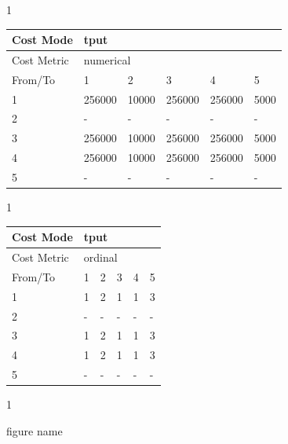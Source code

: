 \begin{figure}
\begin{subtable}{.46\linewidth}
    \caption{1}
    \end{subtable}
    \begin{subtable}{.65\linewidth}
        \centering
        \hspace{-4em}
        \begin{tabular}{|l|l|l|l|l|l|}
        \hline
        Cost Mode   & \multicolumn{5}{|l|}{tput}                       \\ \hline
        Cost Metric & \multicolumn{5}{|l|}{numerical}                  \\ \hline
        From/To     & 1         & 2     & 3        & 4        & 5      \\ \hline
        1           & 256000    & 10000 & 256000   & 256000   & 5000   \\ \hline
        2           & -         & -     & -        & -        & -      \\ \hline
        3           & 256000    & 10000 & 256000   & 256000   & 5000   \\ \hline
        4           & 256000    & 10000 & 256000   & 256000   & 5000   \\ \hline
        5           & -         & -     & -        & -        & -      \\ \hline
        \end{tabular}
    \caption{1}
    \end{subtable}
    \begin{subtable}{.30\linewidth}
        \centering
        \begin{tabular}{|l|l|l|l|l|l|}
        \hline
        Cost Mode   & \multicolumn{5}{|l|}{tput}                       \\ \hline
        Cost Metric & \multicolumn{5}{|l|}{ordinal}                    \\ \hline
        From/To     & 1         & 2     & 3        & 4        & 5      \\ \hline
        1           & 1         & 2     & 1        & 1        & 3      \\ \hline
        2           & -         & -     & -        & -        & -      \\ \hline
        3           & 1         & 2     & 1        & 1        & 3      \\ \hline
        4           & 1         & 2     & 1        & 1        & 3      \\ \hline
        5           & -         & -     & -        & -        & -      \\ \hline
        \end{tabular}
    \caption{1}
    \end{subtable}

    \caption{figure name}\label{fig:label}
    \label{table:costmap-example-boundary}
\end{figure}



